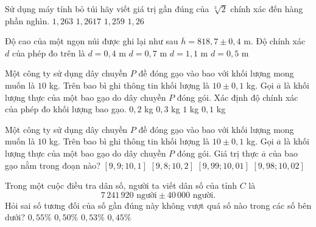 \begin{ex}%
	Sử dụng máy tính bỏ túi hãy viết giá trị gần đúng của $\sqrt[3]{2}$ chính xác đến hàng phần nghìn.
	\choice
	{$1{,}263$}
	{$1{,}2617$}
	{$1{,}259$}
	{\True $1{,}26$}
\end{ex}
\begin{ex}%
	Độ cao của một ngọn núi được ghi lại như sau $\overline{h}=818{,}7\pm 0{,}4$ m. Độ chính xác $d$ của phép đo trên là
	\choice
	{\True $d=0{,}4$ m}
	{$d=0{,}7$ m}
	{$d=1{,}1$ m}
	{$d=0{,}5$ m}
\end{ex}
\begin{ex}%
	Một công ty sử dụng dây chuyền $P$ đề đóng gạo vào bao với khối lượng mong muốn là $10$ kg. Trên bao bì ghi thông tin khối lượng là $10\pm 0{,}1$ kg. Gọi $\overline{a}$ là khối lượng thực của một bao gạo do dây chuyền $P$ đóng gói. Xác định độ chính xác của phép đo khối lượng bao gạo.
	\choice
	{$0{,}2$ kg}
	{$0{,}3$ kg}
	{$1$ kg}
	{\True $0{,}1$ kg}
\end{ex}
\begin{ex}%
	Một công ty sử dụng dây chuyền $P$ đề đóng gạo vào bao với khối lượng mong muốn là $10$ kg. Trên bao bì ghi thông tin khối lượng là $10\pm 0{,}1$ kg. Gọi $\overline{a}$ là khối lượng thực của một bao gạo do dây chuyền $P$ đóng gói. Giá trị thực $\overline{a}$ của bao gạo nằm trong đoạn nào?
	\choice
	{\True $[9{,}9;10{,}1]$}
	{$[9{,}8;10{,}2]$}
	{$[9{,}99;10{,}01]$}
	{$[9{,}98;10{,}02]$}
\end{ex}
\begin{ex}%
	Trong một cuộc điều tra dân số, người ta viết dân số của tỉnh $C$ là
	$$7\,241\,920 \text{ người} \pm 40\,000 \text{ người}.$$
	Hỏi sai số tương đối của số gần đúng này không vượt quá số nào trong các số bên dưới?
	\choice
	{\True $0{,}55\%$}
	{$0{,}50\%$}
	{$0{,}53\%$}
	{$0{,}45\%$}
\end{ex}
